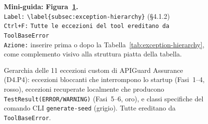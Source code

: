 \begin{figure}[ht]
{
  }%
  \caption{Gerarchia delle 11 eccezioni custom di APIGuard Assurance (D4.P4): eccezioni bloccanti che interrompono lo startup (Fasi~1--4, rosso), eccezioni recuperate localmente che producono \texttt{TestResult(ERROR/WARNING)} (Fasi~5--6, oro), e classi specifiche del comando \gls{CLI} \texttt{generate-seed} (grigio). Tutte ereditano da \texttt{ToolBaseError}.}
  \label{fig:exception-hierarchy}
  \par\smallskip
  {\small \noindent\textbf{Mini-guida: Figura~\ref{fig:exception-hierarchy}.}\\
    \texttt{Label:} \verb|\label{subsec:exception-hierarchy}| (\S4.1.2)\\
    \texttt{Ctrl+F:} \texttt{Tutte le eccezioni del tool ereditano da ToolBaseError}\\
    \texttt{Azione:} inserire prima o dopo la Tabella~\ref{tab:exception-hierarchy}, come complemento visivo alla struttura piatta della tabella. }
\end{figure}


